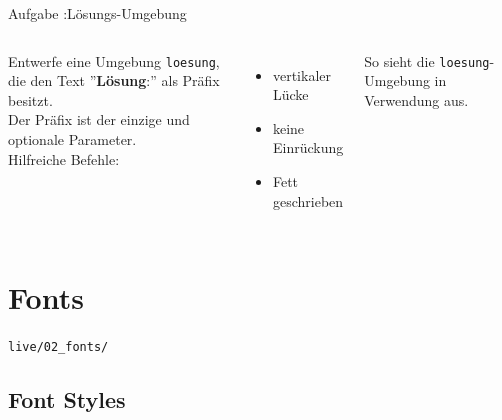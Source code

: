 \documentclass[14pt,aspectratio=169]{beamer}
\begin{document}
\begin{frame}{\insertsection}
    \begin{alertblock}{Aufgabe \aufgabennummer:\quad Lösungs-Umgebung}
        
        \begin{columns}
            
            Entwerfe eine Umgebung \texttt{loesung}, die den Text 
            ''\textbf{Lösung}:'' als Präfix besitzt.\\
            Der Präfix ist der einzige und optionale Parameter.\\[.5em]
            
            Hilfreiche Befehle:
            \begin{itemize}
                \item \texttt{\medskip} vertikaler Lücke
                \item \texttt{\noindent} keine Einrückung
                \item \texttt{\textbf{}} Fett geschrieben
            \end{itemize}
                    
            
            \begin{loesung}
                So sieht die \texttt{loesung}-Umgebung in Verwendung aus.
            \end{loesung}
                        
        \end{columns}        
    \end{alertblock}
\end{frame}



\section{Fonts}
\begin{frame}
    \sectionpage
    \vspace{.5em}
    \large \faFolderOpen \texttt{live/02_fonts/} 
\end{frame}


\subsection{Font Styles}
\end{document}

